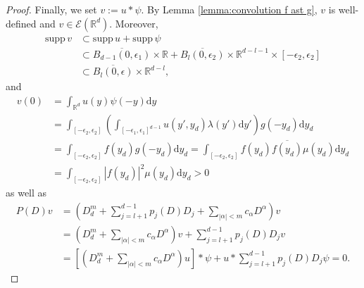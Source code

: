 \documentclass[a4paper,10pt]{amsart}
\newtheorem*{crucial lemma}{Lemma \ref{lem:nice polynomial2}}
\theoremstyle{definition}
\newcommand{\R}{\mathbb{R}}
\newcommand{\supp}{\mbox{supp}\,}
\begin{document}
\begin{proof}
	Finally, we set $v:=u\ast\psi$. By Lemma \ref{lemma:convolution f ast g}, $v$ is well-defined and $v\in \mathscr{E}(\R^d)$. Moreover,
    \begin{align*}
		\supp{v}&\subset\supp u+\supp\psi\\
		&\subset\overline{B_{d-1}(0,\epsilon_1)}\times\R
		+\overline{B_{l}(0,\epsilon_2)}\times\R^{d-l-1}\times\left[-\epsilon_2,\epsilon_2\right]\\
		&\subset\overline{B_{l}(0,\epsilon)}\times\R^{d-l},
	\end{align*}
	and
	\begin{align*}
		v(0)&=\int_{\R^d}u(y)\psi(-y)\mathrm{d}y\\
		&=\int_{[-\epsilon_2,\epsilon_2]}\left(\int_{[-\epsilon_1,\epsilon_1]^{d-1}}u(y',y_d)\lambda(y')\mathrm{d}y'\right)g(-y_d)\mathrm{d}y_d\\
		&=\int_{[-\epsilon_2,\epsilon_2]}f(y_d)g(-y_d)\mathrm{d}y_d=\int_{[-\epsilon_2,\epsilon_2]}f(y_d)\overline{f(y_d)}\mu(y_d)\mathrm{d}y_d\\
		&=\int_{[-\epsilon_2,\epsilon_2]}|f(y_d)|^2\mu(y_d)\mathrm{d}y_d>0
	\end{align*}
	as well as
	\begin{align*}
		P(D)v&=\left(D_d^m+\sum_{j=l+1}^{d-1}p_j(D)D_j+\sum_{|\alpha|<m}c_\alpha D^\alpha\right)v\\
		&=\left(D_d^m+\sum_{|\alpha|<m}c_\alpha D^\alpha\right)v
		+\sum_{j=l+1}^{d-1}p_j(D)D_jv\\
		&=\left[\left(D_d^m+\sum_{|\alpha|<m}c_\alpha D^\alpha\right)u\right]\ast\psi+u\ast\sum_{j=l+1}^{d-1}p_j(D)D_j\psi=0.
	\end{align*}
	

\end{proof}
\end{document}
